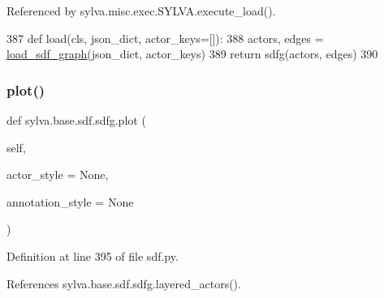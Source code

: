 Referenced by sylva.\+misc.\+exec.\+S\+Y\+L\+V\+A.\+execute\+\_\+load().


\begin{DoxyCode}
387         \textcolor{keyword}{def }load(cls, json\_dict, actor\_keys=[]):
388             actors, edges = \hyperlink{namespacesylva_1_1base_1_1sdf_a0bdfa7a81bf9648662631113a609062d}{load\_sdf\_graph}(json\_dict, actor\_keys)
389             \textcolor{keywordflow}{return} sdfg(actors, edges)
390 
\end{DoxyCode}
\mbox{\label{classsylva_1_1base_1_1sdf_1_1sdfg_a0ec53888667270ea6aec60425b2c8742}} 
\subsubsection{\texorpdfstring{plot()}{plot()}}
{\footnotesize\ttfamily def sylva.\+base.\+sdf.\+sdfg.\+plot (\begin{DoxyParamCaption}\item[{}]{self,  }\item[{}]{actor\+\_\+style = {\ttfamily None},  }\item[{}]{annotation\+\_\+style = {\ttfamily None} }\end{DoxyParamCaption})}



Definition at line 395 of file sdf.\+py.



References sylva.\+base.\+sdf.\+sdfg.\+layered\+\_\+actors().


